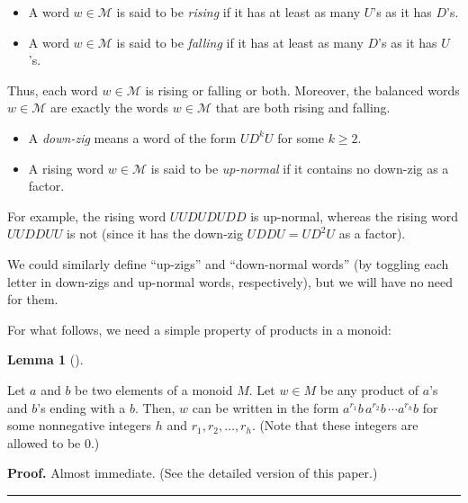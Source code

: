 \documentclass[numbers=enddot,12pt,final,onecolumn,notitlepage]{scrartcl}%
\theoremstyle{definition}
\newtheorem{lem}[theo]{Lemma}
\newenvironment{lemma}[1][]
{\begin{lem}[#1]\begin{leftbar}}
{\end{leftbar}\end{lem}}
\newenvironment{proof}[1][Proof]{\noindent\textbf{#1.} }{\ \rule{0.5em}{0.5em}}
\newcommand{\M}{\mathcal{M}}
\newenvironment{vershort}{}{}
\begin{document}
\begin{itemize}
\item A word $w\in\M$ is said to be \emph{rising} if it has at least
as many $U$'s as it has $D$'s.

\item A word $w\in\M$ is said to be \emph{falling} if it has at least
as many $D$'s as it has $U$'s.
\end{itemize}

Thus, each word $w\in\M$ is rising or falling or both. Moreover, the
balanced words $w\in\M$ are exactly the words $w\in\M$ that
are both rising and falling.

\begin{itemize}

\item A \emph{down-zig} means a word of the form $UD^{k}U$ for some $k\geq2$.

\item A rising word $w\in\M$ is said to be \emph{up-normal} if it
contains no down-zig as a factor.

\end{itemize}

For example, the rising word $UUDUDUDD$ is up-normal, whereas the rising word
$UUDDUU$ is not (since it has the down-zig $UDDU=UD^{2}U$ as a factor).

We could similarly define ``up-zigs'' and ``down-normal words'' (by
toggling each letter in down-zigs and up-normal words, respectively), but we
will have no need for them.
\medskip

For what follows, we need a simple property of products in a monoid:

\begin{lemma}
\label{lem.arb}
Let $a$ and $b$ be two elements of a monoid $M$.
Let $w \in M$ be any product of $a$'s and $b$'s ending with a $b$.
Then, $w$ can be written in the form $a^{r_1}b\, a^{r_2}b\, \cdots a^{r_h}b$
for some nonnegative integers $h$ and $r_1, r_2, \ldots, r_h$. (Note that these integers are allowed to be $0$.)
\end{lemma}

\begin{vershort}
\begin{proof}
Almost immediate. (See the detailed version of this paper.)
\end{proof}
\end{vershort}
\end{document}
